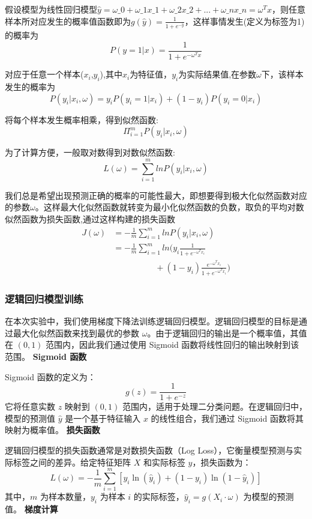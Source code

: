 \documentclass[12pt,a4paper,oneside]{article}
\begin{document}
假设模型为线性回归模型$\hat{y}=\omega\_0+\omega\_1 x\_1+\omega\_2 x\_2+...+\omega\_n x\_n=\omega^T x$，则任意样本所对应发生的概率值函数即为$g(\hat{y})=\frac{1}{1+e^{-\hat{y}}}$，这样事情发生(定义为标签为1)的概率为
$$P(y=1|x)=\frac{1}{1+e^{-\omega^T x}}$$  

对应于任意一个样本(${x_i}$,$y_i$),其中$x_i$为特征值，$y_i$为实际结果值,在参数$\omega$下，该样本发生的概率为
$$P(y_i|x_i,\omega)=y_i{P(y_i=1|x_i)}+({1-y_i}){P(y_i=0|x_i)}$$

将每个样本发生概率相乘，得到似然函数:
$$\Pi^m_{i=1}{P(y_i|x_i,\omega)}$$

为了计算方便，一般取对数得到对数似然函数:
$$L(\omega)=\sum^m_{i=1}{lnP(y_i|x_i,\omega)}$$  

我们总是希望出现预测正确的概率的可能性最大，即想要得到极大化似然函数对应的参数$\omega$。这样最大化似然函数就转变为最小化似然函数的负数，取负的平均对数似然函数为损失函数,通过这样构建的损失函数
\begin{equation*}
    \begin{split}
    J(\omega) &= -\frac{1}{m}\sum^m_{i=1}{lnP(y_i|x_i,\omega)} \\
    &= -\frac{1}{m}\sum^m_{i=1}ln\Big(y_i\frac{1}{1+e^{-\omega^T x_i}} \\
    &\quad\quad\quad\quad\quad + (1-y_i)\frac{e^{-\omega^T x_i}}{1+e^{-\omega^T x_i}}\Big)
    \end{split}
    \end{equation*}





    \subsubsection{逻辑回归模型训练}

    \qquad 在本次实验中，我们使用梯度下降法训练逻辑回归模型。逻辑回归模型的目标是通过最大化似然函数来找到最优的参数 $\omega$。由于逻辑回归的输出是一个概率值，其值在 $(0, 1)$ 范围内，因此我们通过使用 Sigmoid 函数将线性回归的输出映射到该范围。
    \newline\textbf{Sigmoid 函数}

    Sigmoid 函数的定义为：
    \[
    g(z) = \frac{1}{1 + e^{-z}}
    \]
    它将任意实数 $z$ 映射到 $(0, 1)$ 范围内，适用于处理二分类问题。在逻辑回归中，模型的预测值 $\hat{y}$ 是一个基于特征输入 $x$ 的线性组合，我们通过 Sigmoid 函数将其映射为概率值。
    \newline\textbf{损失函数}

    逻辑回归模型的损失函数通常是对数损失函数（Log Loss），它衡量模型预测与实际标签之间的差异。给定特征矩阵 $X$ 和实际标签 $y$，损失函数为：
    \[
    L(\omega) = -\frac{1}{m} \sum_{i=1}^{m} \left[ y_i \ln(\hat{y}_i) + (1 - y_i) \ln(1 - \hat{y}_i) \right]
    \]
    其中，$m$ 为样本数量，$y_i$ 为样本 $i$ 的实际标签，$\hat{y}_i = g(X_i \cdot \omega)$ 为模型的预测值。
    \newline\textbf{梯度计算}
\end{document}
